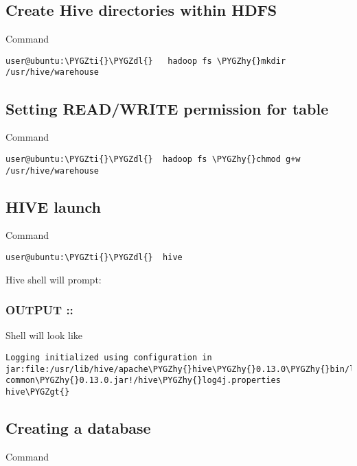\documentclass[letterpaper,10pt,english]{sphinxmanual}
\def\PYGZgt{\char`\>}
\def\PYGZdl{\char`\$}
\def\PYGZhy{\char`\-}
\def\PYGZti{\char`\~}
\begin{document}
\subsection{Create Hive directories within HDFS}
\label{hive:create-hive-directories-within-hdfs}
Command

\begin{Verbatim}[commandchars=\\\{\}]
user@ubuntu:\PYGZti{}\PYGZdl{}   hadoop fs \PYGZhy{}mkdir /usr/hive/warehouse
\end{Verbatim}


\subsection{Setting READ/WRITE permission for table}
\label{hive:setting-read-write-permission-for-table}
Command

\begin{Verbatim}[commandchars=\\\{\}]
user@ubuntu:\PYGZti{}\PYGZdl{}  hadoop fs \PYGZhy{}chmod g+w /usr/hive/warehouse
\end{Verbatim}


\subsection{HIVE launch}
\label{hive:hive-launch}
Command

\begin{Verbatim}[commandchars=\\\{\}]
user@ubuntu:\PYGZti{}\PYGZdl{}  hive
\end{Verbatim}

Hive shell will prompt:


\subsubsection{OUTPUT ::}
\label{hive:output}
Shell will look like

\begin{Verbatim}[commandchars=\\\{\}]
Logging initialized using configuration in jar:file:/usr/lib/hive/apache\PYGZhy{}hive\PYGZhy{}0.13.0\PYGZhy{}bin/lib/hive\PYGZhy{} common\PYGZhy{}0.13.0.jar!/hive\PYGZhy{}log4j.properties
hive\PYGZgt{}
\end{Verbatim}


\subsection{Creating a database}
\label{hive:creating-a-database}
Command
\end{document}
